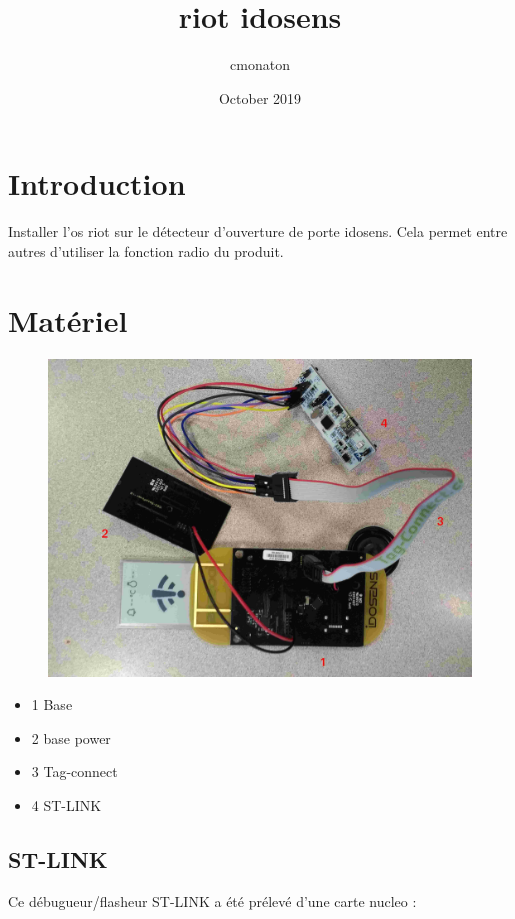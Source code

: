 \documentclass{article}
\title{riot idosens}
\author{cmonaton }
\date{October 2019}
\begin{document}
\maketitle

\section{Introduction}
Installer l'os riot sur le détecteur d'ouverture de porte idosens. Cela permet entre autres d'utiliser la fonction radio du produit.

\section{Matériel}

\begin{figure}[H]
\begin{center}
\advance\leftskip-3cm
\advance\rightskip-3cm
\includegraphics[keepaspectratio=true,scale=0.1]{idosens_numerote.jpg}
\label{visina8}
\end{center}\end{figure}

\begin{itemize}
    \item 1  Base
    \item{2} base power
    \item 3 Tag-connect
    \item 4 ST-LINK
\end{itemize}

\subsection{ST-LINK}
Ce débugueur/flasheur ST-LINK a été prélevé d'une carte nucleo :
\end{document}
